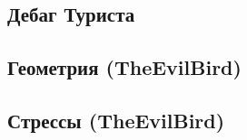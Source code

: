 \documentclass[a4paper]{article}
\begin{document}
\begin{multicols*}{2}
        \subsection{Дебаг Туриста}
            
        
        \subsection{Геометрия (TheEvilBird)}
            

        \subsection{Стрессы (TheEvilBird)}
            
    
\end{multicols*}


\end{document}
